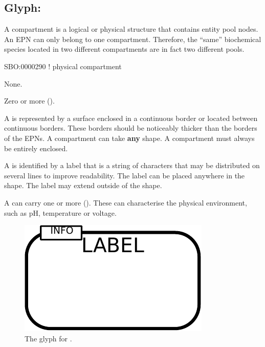 \subsection{Glyph: }
\label{sec:compartment}

A compartment is a logical or physical structure that contains entity pool nodes. An EPN can only belong to one compartment. Therefore, the ``same'' biochemical species located in two different compartments are in fact two different pools.

\begin{glyphDescription}

\glyphSboTerm  SBO:0000290 ! physical compartment


\glyphIncoming
None.



\glyphOutgoing
Zero or more  ().


\glyphContainer
A  is represented by a surface enclosed in a continuous border or located between continuous borders.
These borders should be noticeably thicker than the borders of the EPNs.
A compartment can take \textbf{any} shape.
A compartment must always be entirely enclosed.

\glyphLabel
A  is identified by a label that is  a string of characters that may be distributed on several lines to improve readability.
The label can be placed anywhere in the shape.
The label may extend outside of the shape.

\glyphAux
A  can carry one or more  ().
These can characterise the physical environment, such as pH, temperature or voltage.




\end{glyphDescription}

\begin{figure}[H]
  \centering
  \includegraphics{images/build/compartment.pdf}
  \caption{The \PD glyph for .}
  \label{fig:compartment}
\end{figure}


